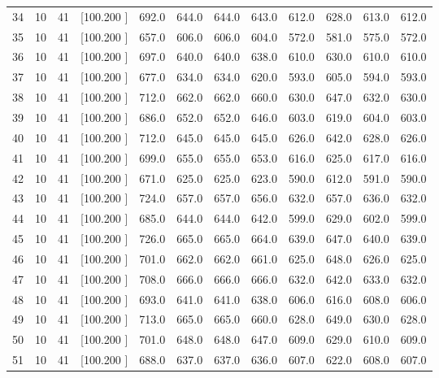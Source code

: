 \documentclass[12pt,a4paper]{article}
\begin{document}
\begin{center}
{\begin{tabular}{r r r r r r r r r r r r}
  34& 10& 41&[100.200   ]&   692.0&   644.0&   644.0&   643.0&   612.0&   628.0&   613.0&   612.0\\[-0.02in]
  35& 10& 41&[100.200   ]&   657.0&   606.0&   606.0&   604.0&   572.0&   581.0&   575.0&   572.0\\[-0.02in]
  36& 10& 41&[100.200   ]&   697.0&   640.0&   640.0&   638.0&   610.0&   630.0&   610.0&   610.0\\[-0.02in]
  37& 10& 41&[100.200   ]&   677.0&   634.0&   634.0&   620.0&   593.0&   605.0&   594.0&   593.0\\[-0.02in]
  38& 10& 41&[100.200   ]&   712.0&   662.0&   662.0&   660.0&   630.0&   647.0&   632.0&   630.0\\[-0.02in]
  39& 10& 41&[100.200   ]&   686.0&   652.0&   652.0&   646.0&   603.0&   619.0&   604.0&   603.0\\[-0.02in]
  40& 10& 41&[100.200   ]&   712.0&   645.0&   645.0&   645.0&   626.0&   642.0&   628.0&   626.0\\[-0.02in]
  41& 10& 41&[100.200   ]&   699.0&   655.0&   655.0&   653.0&   616.0&   625.0&   617.0&   616.0\\[-0.02in]
  42& 10& 41&[100.200   ]&   671.0&   625.0&   625.0&   623.0&   590.0&   612.0&   591.0&   590.0\\[-0.02in]
  43& 10& 41&[100.200   ]&   724.0&   657.0&   657.0&   656.0&   632.0&   657.0&   636.0&   632.0\\[-0.02in]
  44& 10& 41&[100.200   ]&   685.0&   644.0&   644.0&   642.0&   599.0&   629.0&   602.0&   599.0\\[-0.02in]
  45& 10& 41&[100.200   ]&   726.0&   665.0&   665.0&   664.0&   639.0&   647.0&   640.0&   639.0\\[-0.02in]
  46& 10& 41&[100.200   ]&   701.0&   662.0&   662.0&   661.0&   625.0&   648.0&   626.0&   625.0\\[-0.02in]
  47& 10& 41&[100.200   ]&   708.0&   666.0&   666.0&   666.0&   632.0&   642.0&   633.0&   632.0\\[-0.02in]
  48& 10& 41&[100.200   ]&   693.0&   641.0&   641.0&   638.0&   606.0&   616.0&   608.0&   606.0\\[-0.02in]
  49& 10& 41&[100.200   ]&   713.0&   665.0&   665.0&   660.0&   628.0&   649.0&   630.0&   628.0\\[-0.02in]
  50& 10& 41&[100.200   ]&   701.0&   648.0&   648.0&   647.0&   609.0&   629.0&   610.0&   609.0\\[-0.02in]
  51& 10& 41&[100.200   ]&   688.0&   637.0&   637.0&   636.0&   607.0&   622.0&   608.0&   607.0\\[-0.02in]

\end{tabular}}
\end{center}
\end{document}
